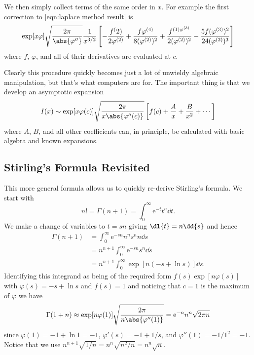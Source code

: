 \documentclass[fleqn]{NotesClass}
\newcommand*{\e}{\mathrm{e}}
\begin{document}
    We then simply collect terms of the same order in \(x\).
    For example the first correction to \cref{eqn:laplace method result} is
    \begin{equation}
        \exp[x\varphi] \sqrt{\frac{2\pi}{\abs{\varphi''}}}\frac{1}{x^{3/2}} \left[ -\frac{f^(2)}{2\varphi^{(2)}} + \frac{f\varphi^{(4)}}{8(\varphi^{(2)})^2} + \frac{f^{(1)\varphi^{(3)}}}{2(\varphi^{(2)})^2} - \frac{5f(\varphi^{(3)})^2}{24(\varphi^{(2)})^3} \right]
    \end{equation}
    where \(f\), \(\varphi\), and all of their derivatives are evaluated at \(c\).
    
    Clearly this procedure quickly becomes just a lot of unwieldy algebraic manipulation, but that's what computers are for.
    The important thing is that we develop an asymptotic expansion
    \begin{equation}
        I(x) \sim \exp[x\varphi(c)] \sqrt{\frac{2\pi}{x\abs{\varphi''(c)}}} \left[ f(c) + \frac{A}{x} + \frac{B}{x^2} + \dotsb \right]
    \end{equation}
    where \(A\), \(B\), and all other coefficients can, in principle, be calculated with basic algebra and known expansions.
    
    \subsection{Stirling's Formula Revisited}
    This more general formula allows us to quickly re-derive Stirling's formula.
    We start with
    \begin{equation}
        n! = \Gamma(n + 1) = \int_{0}^{\infty} \e^{-t}t^{n} \dd{t}.
    \end{equation}
    We make a change of variables to \(t = sn\) giving \(\dl{t} = n\dd{s}\) and hence
    \begin{align}
        \Gamma(n + 1) &= \int_{0}^{\infty} \e^{-sn}n^{n}s^{n} n\dd{s}\\
        &= n^{n+1}\int_0^\infty \e^{-sn} s^n\dd{s}\\
        &= n^{n+1} \int_0^{\infty} \exp[n(-s + \ln s)] \dd{s}.
    \end{align}
    Identifying this integrand as being of the required form \(f(s)\exp[n\varphi(s)]\) with \(\varphi(s) = -s + \ln s\) and \(f(s) = 1\) and noticing that \(c = 1\) is the maximum of \(\varphi\) we have
    \begin{equation}
        \Gamma(1 + n) \approx \exp[n\varphi(1)]\sqrt{\frac{2\pi}{n\abs{\varphi''(1)}}} = \e^{-n}n^{n}\sqrt{2\pi n}
    \end{equation}
    since \(\varphi(1) = -1 + \ln 1 = -1\), \(\varphi'(s) = -1 + 1/s\), and \(\varphi''(1) = -1/1^2 = -1\).
    Notice that we use \(n^{n+1}\sqrt{1/n} = n^{n}\sqrt{n^2/n} = n^n\sqrt{n}\).
    
\end{document}
